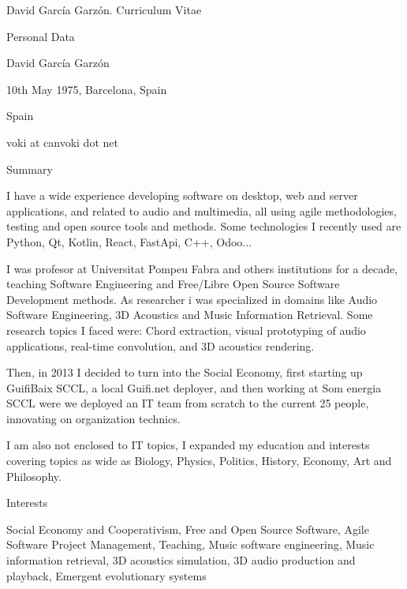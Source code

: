 \documentclass{article}
\begin{document}
\setlength{\cvlabelwidth}{45mm}

\begin{cv}{David García Garzón. Curriculum Vitae}

\begin{cvlist}{Personal Data}
\item[Full name:] David García Garzón
\item[Born] 10th May 1975, Barcelona, Spain
\item[Nationality] Spain
\item[E-mail] voki at canvoki dot net
\end{cvlist}

\begin{cvlist}{Summary}
\item[] I have a wide experience developing software on desktop, web and server applications, and related to audio and multimedia,
all using agile methodologies, testing and open source tools and methods.
Some technologies I recently used are Python, Qt, Kotlin, React, FastApi, C++, Odoo...

I was profesor at Universitat Pompeu Fabra and others institutions for a decade,
teaching Software Engineering and Free/Libre Open Source Software Development methods.
As researcher i was specialized in domains like Audio Software Engineering, 3D Acoustics and Music Information Retrieval.
Some research topics I faced were:
Chord extraction,
visual prototyping of audio applications,
real-time convolution,
and 3D acoustics rendering.

Then, in 2013 I decided to turn into the Social Economy,
first starting up GuifiBaix SCCL, a local Guifi.net deployer,
and then working at Som energia SCCL were we deployed an IT team
from scratch to the current 25 people, innovating on organization technics.

I am also not enclosed to IT topics, I expanded my education and interests
covering topics as wide as
Biology, Physics, Politics, History, Economy, Art and Philosophy.

\end{cvlist}

\begin{cvlist}{Interests}
\item[] Social Economy and Cooperativism, Free and Open Source Software, Agile Software Project Management, Teaching, Music software engineering, Music information retrieval, 3D acoustics simulation, 3D audio production and playback, Emergent evolutionary systems
\end{cvlist}




\end{cv}
\end{document}
